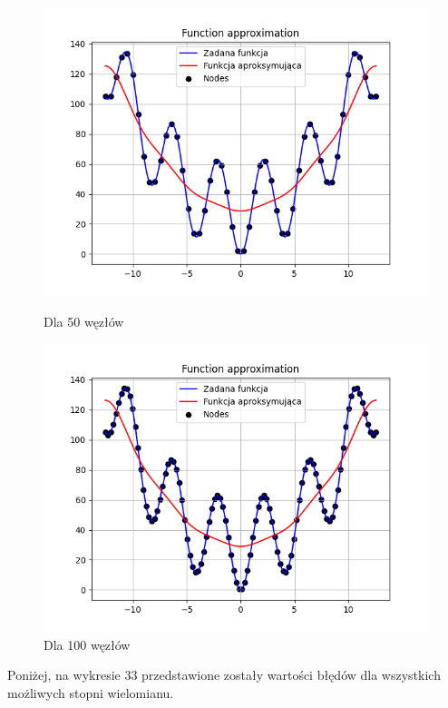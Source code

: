 \documentclass{article}
\begin{document}
\begin{figure}[H]
\begin{minipage}[b]{0.49\textwidth}
    \begin{minipage}[b]{\textwidth}
      \includegraphics[width=\textwidth]{img31.png}
      \caption{Dla 50 węzłów}
    \end{minipage}
    \vspace*{\fill}
    \begin{minipage}[b]{\textwidth}
      \includegraphics[width=\textwidth]{img32.png}
      \caption{Dla 100 węzłów}
    \end{minipage}
  \end{minipage}
\end{figure}

\noindent
Poniżej, na wykresie 33 przedstawione zostały wartości błędów dla wszystkich możliwych stopni wielomianu.
\end{document}
